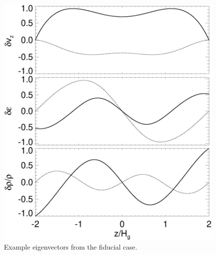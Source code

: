 \begin{figure}
  \includegraphics[width=\linewidth]{figures/eigenvec}
  \caption{Example eigenvectors from the fiducial case. 
  \label{eigen_vec}} 
\end{figure}
